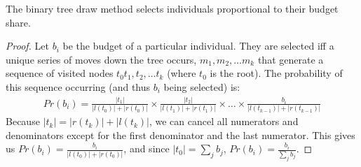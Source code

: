 \documentclass[prodmode,acmec]{acmsmall}
\begin{document}
\begin{proposition}
The binary tree draw method selects individuals proportional to their
budget share.
\end{proposition} 
\begin{proof}  
Let $b_i$ be the budget of a particular individual. They are selected
iff a unique series of moves down the tree occurs, $m_1,m_2,\ldots
m_k$ that generate a sequence of visited nodes $t_0t_1,t_2,\ldots t_k$
(where $t_0$ is the root). The probability of this sequence occurring
(and thus $b_i$ being selected) is:
\begin{eqnarray*} 
  Pr(b_i) = \frac{|t_1|}{|l(t_0)| + |r(t_0)|} \times
  \frac{|t_2|}{|l(t_1)| + |r(t_1)|} \times \ldots \times
  \frac{b_i}{|l(t_{k-1})| + |r(t_{k-1})|}
\end{eqnarray*} 
Because $|t_k| = |r(t_k)| + |l(t_k)|$, we can cancel all numerators
and denominators except for the first denominator and the last
numerator. This gives us $Pr(b_i) = \frac{b_i}{|l(t_0)| + |r(t_0)|}$,
and since $|t_0| = \sum_j b_j$, $Pr(b_i) = \frac{b_i}{\sum_j b_j}$.
\end{proof} 

\end{document}
